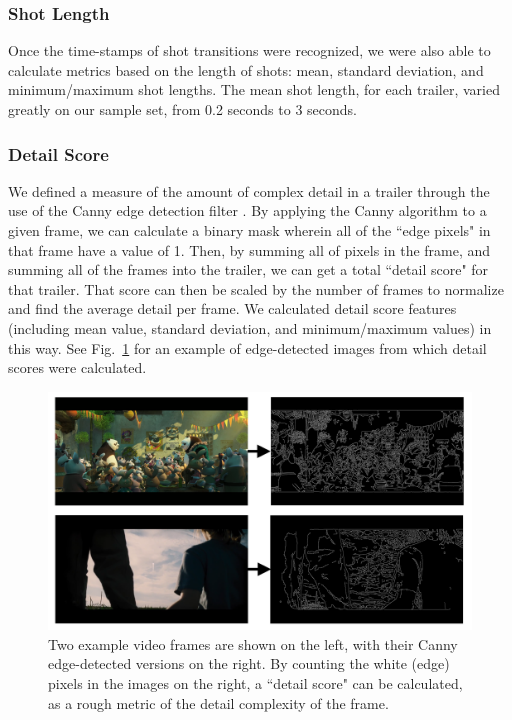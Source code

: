 \documentclass[letterpaper, 10 pt, conference]{ieeeconf}  %
\begin{document}
\subsubsection{Shot Length}
Once the time-stamps of shot transitions were recognized, we were also able to calculate metrics based on the length of shots: mean, standard deviation, and minimum/maximum shot lengths. The mean shot length, for each trailer, varied greatly on our sample set, from 0.2 seconds to 3 seconds.

\subsubsection{Detail Score}
We defined a measure of the amount of complex detail in a trailer through the use of the Canny edge detection filter \cite{canny}. By applying the Canny algorithm to a given frame, we can calculate a binary mask wherein all of the ``edge pixels" in that frame have a value of 1. Then, by summing all of pixels in the frame, and summing all of the frames into the trailer, we can get a total ``detail score" for that trailer. That score can then be scaled by the number of frames to normalize and find the average detail per frame. We calculated detail score features (including mean value, standard deviation, and minimum/maximum values) in this way. See Fig.~\ref{f:canny_combined} for an example of edge-detected images from which detail scores were calculated.

\begin{figure}[h]
	\centering
	\includegraphics[width=\columnwidth]{canny_combined.png}
	\caption{Two example video frames are shown on the left, with their Canny edge-detected versions on the right. By counting the white (edge) pixels in the images on the right, a ``detail score" can be calculated, as a rough metric of the detail complexity of the frame.}
	\label{f:canny_combined}
\end{figure}
\end{document}
